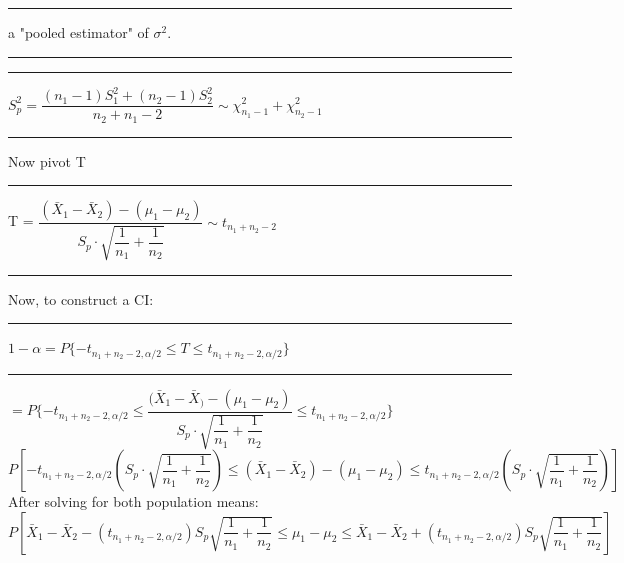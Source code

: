 \documentclass[]{article}
\begin{document}
\newline\Large\rule{3.0cm}{0pt}  a "pooled estimator" of $\sigma^2$.
\newline\Large\rule{3.0cm}{0pt} 
\newline\Large\rule{3.0cm}{0pt} $S^2_p = \dfrac{(n_1 -1)S^2_1 + (n_2 - 1) S^2_2}{n_2 + n_1- 2} \sim \chi^2_{n_1 -1} + \chi^2_{n_2 -1}$ 
\newline\newline\Large\rule{3.0cm}{0pt} Now pivot T
\newline\newline\Large\rule{3.0cm}{0pt} T = $\dfrac{  (  \bar{X}_1 - \bar{X}_2 )  -  (\mu_1 - \mu_2)   }{S_p \cdot \sqrt{\dfrac{1}{n_1} + \dfrac{1}{n_2} }} \sim t_{n_1 + n_2 - 2}$
\newline
\newline\newline\Large\rule{3.0cm}{0pt}  Now, to construct a CI:
\newline\Large\rule{3.0cm}{0pt} $1 - \alpha = P \{ -t_{n_1 + n_2 - 2, \alpha / 2} \le T \le t_{n_1 + n_2 - 2, \alpha /2} \}$ 
\newline
\newline
\newline\Large\rule{2.3cm}{0pt} $ = P \{ -t_{n_1 + n_2 - 2, \alpha / 2} \le \dfrac{ ( \bar{X}_1 - \bar{X}_  ) - (\mu_1 - \mu_2)   }{S_p \cdot \sqrt{\dfrac{1}{n_1} + \dfrac{1}{n_2} }} \le t_{n_1 + n_2 - 2, \alpha /2} \}$
\newline
\newline
\newline
$P \left[  -t_{n_1 + n_2 - 2, \alpha / 2} \left( S_p \cdot \sqrt{\dfrac{1}{n_1} + \dfrac{1}{n_2}} \right) \le  (  \bar{X}_1 - \bar{X}_2 )  -  (\mu_1 - \mu_2) \le t_{n_1 + n_2 - 2, \alpha /2} \left( S_p \cdot \sqrt{\dfrac{1}{n_1} + \dfrac{1}{n_2}} \right)  \right]$
\newline
\newline
\newline After solving for both population means:
\newline
\newline$P\left[  \bar{X}_1 - \bar{X}_2 - ( t_{n_1 + n_2 - 2, \alpha / 2} ) S_p \sqrt{\dfrac{1}{n_1} + \dfrac{1}{n_2}}  \le  \mu_1 - \mu_2 \le  \bar{X}_1 - \bar{X}_2  +  (t_{n_1 + n_2 - 2, \alpha /2}) S_p \sqrt{\dfrac{1}{n_1} + \dfrac{1}{n_2}} \right]$
 
\section{}
\end{document}
